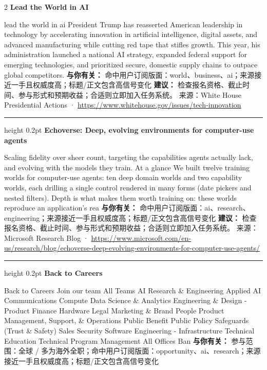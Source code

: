 \documentclass[10.5pt]{ctexart}
\begin{document}
\begin{multicols}{2}
{\large\bfseries Lead the World in AI}\par
lead the world in ai President Trump has reasserted American leadership in technology by accelerating innovation in artificial intelligence, digital assets, and advanced manufacturing while cutting red tape that stifles growth. This year, his administration launched a national AI strategy, expanded federal support for emerging technologies, and prioritized secure, domestic supply chains to outpace global competitors.
\textbf{与你有关：} 命中用户订阅版面：world、business、ai；来源接近一手且权威度高；标题/正文包含高信号变化
\textbf{建议：} 检查报名资格、截止时间、参与形式和预期收益；合适则立即加入任务系统。
{\footnotesize\color{ormuted} 来源：White House Presidential Actions · \url{https://www.whitehouse.gov/issues/tech-innovation}}
\vspace{2mm}
\hrule height 0.2pt
\vspace{2mm}
{\large\bfseries Echoverse: Deep, evolving environments for computer-use agents}\par
Scaling fidelity over sheer count, targeting the capabilities agents actually lack, and evolving with the models they train. At a glance We built twelve training worlds for computer-use agents: ten deep domain worlds and two capability worlds, each drilling a single control rendered in many forms (date pickers and nested filters). Depth is what makes them worth training on: these worlds reproduce an application’s rea
\textbf{与你有关：} 命中用户订阅版面：ai、research、engineering；来源接近一手且权威度高；标题/正文包含高信号变化
\textbf{建议：} 检查报名资格、截止时间、参与形式和预期收益；合适则立即加入任务系统。
{\footnotesize\color{ormuted} 来源：Microsoft Research Blog · \url{https://www.microsoft.com/en-us/research/blog/echoverse-deep-evolving-environments-for-computer-use-agents/}}
\vspace{2mm}
\hrule height 0.2pt
\vspace{2mm}
{\large\bfseries Back to Careers}\par
Back to Careers Join our team All Teams AI Research \& Engineering Applied AI Communications Compute Data Science \& Analytics Engineering \& Design - Product Finance Hardware Legal Marketing \& Brand People Product Management, Support, \& Operations Public Benefit Public Policy Safeguards (Trust \& Safety) Sales Security Software Engineering - Infrastructure Technical Education Technical Program Management All Offices Ban
\textbf{与你有关：} 参与范围：全球 / 多为海外全职；命中用户订阅版面：opportunity、ai、research；来源接近一手且权威度高；标题/正文包含高信号变化

\end{multicols}
\end{document}
